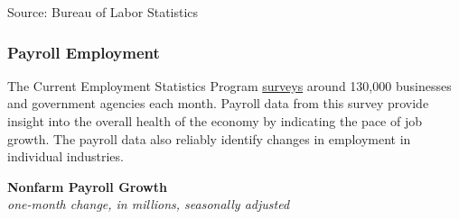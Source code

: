 \documentclass{report}
\makeatletter
\newcommand*\short[1]{\expandafter\@gobbletwo\number\numexpr#1\relax}
\newcommand{\ctsbar}[5]{
		\addplot[ybar stacked, bar width=#5, draw opacity=0, fill=#1] 
			table [x=#2, y=#3, col sep=comma]{#4};}
\newcommand{\absnode}[3]{\node[below right, align=left] at (axis cs: #1,#2) {#3};}
\newcommand{\ltdateaxisticks}{
		date coordinates in=x, axis line style={draw=none},
		xmax={2023-11-30},
		max space between ticks=40,	    
		xtick={{2013-01-01}, {2014-01-01}, {2015-01-01}, {2016-01-01}, {2017-01-01}, {2018-01-01}, 
		    {2019-01-01}, {2020-01-01}, {2021-01-01}, {2022-01-01}, {2023-01-01}, {2024-01-01}},
		enlarge y limits={0.06}, enlarge x limits={0.01},
		xticklabel style={align=center, yshift=-2pt}, tick label style={inner sep=0pt},
		}
\newcommand{\bbar}[2]{extra #1 ticks = {{#2}}, extra #1 tick labels = ,
		extra #1 tick style = {grid=major, grid style={thick, black!25}},}
\newcommand{\rbar}{
		\fill[color=black!10] (axis cs:{2020-02-01},\pgfkeysvalueof{/pgfplots/ymin}) rectangle 
			(axis cs:{2020-05-01}, \pgfkeysvalueof{/pgfplots/ymax});}
\makeatother
\begin{document}
{\begin{minipage}{0.76\textwidth}
\vspace{-1mm}	
\footnotesize{Source: Bureau of Labor Statistics}
\end{minipage}
\newpage
\vspace*{-10mm}

\begin{minipage}{0.76\textwidth}  
\subsubsection*{Payroll Employment}
\small The Current Employment Statistics Program \href{https://www.bls.gov/ces/}{surveys} around 130,000 businesses and government agencies each month. Payroll data from this survey provide insight into the overall health of the economy by indicating the pace of job growth. The payroll data also reliably identify changes in employment in individual industries. 
\end{minipage}

\begin{minipage}{0.28\textwidth}
\small 
\end{minipage} \hspace{5mm}
\begin{minipage}{0.44\textwidth}
\normalsize \textbf{Nonfarm Payroll Growth}\\
\footnotesize{\textit{one-month change, in millions, seasonally adjusted}}
\vspace{7.0cm}

\hspace{3mm} 


\end{minipage}}
\end{document}
